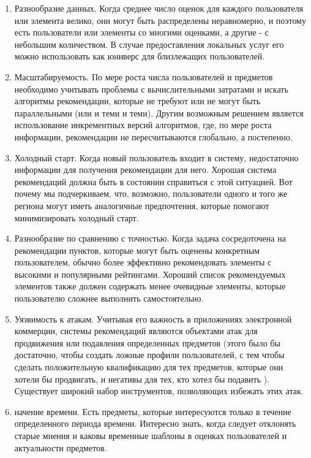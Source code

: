 \begin{enumerate}
\item
Разнообразие данных. Когда среднее число оценок для каждого пользователя или элемента велико, они могут быть распределены неравномерно, и поэтому есть пользователи или элементы со многими оценками, а другие - с небольшим количеством. В случае предоставления локальных услуг его можно использовать как юниверс для близлежащих пользователей.

\item
Масштабируемость. По мере роста числа пользователей и предметов необходимо учитывать проблемы с вычислительными затратами и искать алгоритмы рекомендации, которые не требуют или не могут быть параллельными (или и теми и теми). Другим возможным решением является использование инкрементных версий алгоритмов, где, по мере роста информации, рекомендации не пересчитываются глобально, а постепенно.

\item
Холодный старт. Когда новый пользователь входит в систему, недостаточно информации для получения рекомендации для него. Хорошая система рекомендаций должна быть в состоянии справиться с этой ситуацией. Вот почему мы подчеркиваем, что, возможно, пользователи одного и того же региона могут иметь аналогичные предпочтения, которые помогают минимизировать холодный старт.

\item
Разнообразие по сравнению с точностью. Когда задача сосредоточена на рекомендации пунктов, которые могут быть оценены конкретным пользователем, обычно более эффективно рекомендовать элементы с высокими и популярными рейтингами. Хороший список рекомендуемых элементов также должен содержать менее очевидные элементы, которые пользователю сложнее выполнить самостоятельно.

\item
Уязвимость к атакам. Учитывая его важность в приложениях электронной коммерции, системы рекомендаций являются объектами атак для продвижения или подавления определенных предметов (этого было бы достаточно, чтобы создать ложные профили пользователей, с тем чтобы сделать положительную квалификацию для тех предметов, которые они хотели бы продвигать, и негативы для тех, кто хотел бы подавить ). Существует широкий набор инструментов, позволяющих избежать этих атак.

\item
начение времени. Есть предметы, которые интересуются только в течение определенного периода времени. Интересно знать, когда следует отклонять старые мнения и каковы временные шаблоны в оценках пользователей и актуальности предметов.


\end{enumerate}
